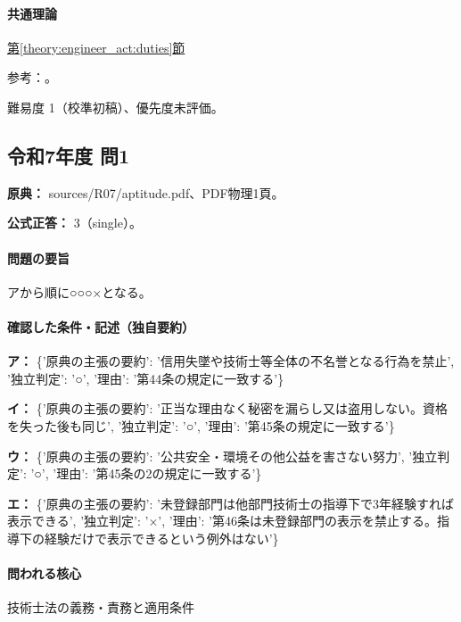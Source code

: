 \paragraph{共通理論} \hyperref[theory:engineer_act:duties]{第\ref*{theory:engineer_act:duties}節}

\par 参考：\cite{engineer_act_current}。

\par 難易度 1（校準初稿）、優先度未評価。

\subsection{令和7年度 問1}
\label{q:r07-reg-apt-01}

\noindent\textbf{原典：} sources/R07/aptitude.pdf、PDF物理1頁。

\textbf{公式正答：} 3（single）。

\paragraph{問題の要旨} アから順に○○○×となる。

\paragraph{確認した条件・記述（独自要約）}\mbox{}\par

\noindent\textbf{ア：} \{'原典の主張の要約': '信用失墜や技術士等全体の不名誉となる行為を禁止', '独立判定': '○', '理由': '第44条の規定に一致する'\}\par

\noindent\textbf{イ：} \{'原典の主張の要約': '正当な理由なく秘密を漏らし又は盗用しない。資格を失った後も同じ', '独立判定': '○', '理由': '第45条の規定に一致する'\}\par

\noindent\textbf{ウ：} \{'原典の主張の要約': '公共安全・環境その他公益を害さない努力', '独立判定': '○', '理由': '第45条の2の規定に一致する'\}\par

\noindent\textbf{エ：} \{'原典の主張の要約': '未登録部門は他部門技術士の指導下で3年経験すれば表示できる', '独立判定': '×', '理由': '第46条は未登録部門の表示を禁止する。指導下の経験だけで表示できるという例外はない'\}\par

\paragraph{問われる核心} 技術士法の義務・責務と適用条件

